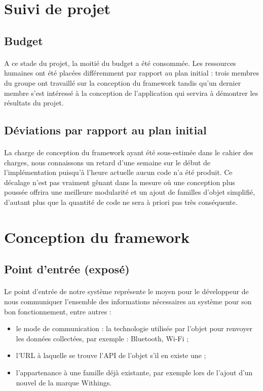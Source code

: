\documentclass[nocopyrightspace]{sigplanconf}
\begin{document}
\section{Suivi de projet}

	\subsection{Budget}
		\paragraph{}
		A ce stade du projet, la moitié du budget a été consommée. Les ressources humaines ont été placées différemment par rapport au plan initial : trois membres du groupe ont travaillé sur la conception du framework tandis qu'un dernier membre s'est intéressé à la conception de l'application qui servira à démontrer les résultats du projet.

	\subsection{Déviations par rapport au plan initial}
		\paragraph{}
		La charge de conception du framework ayant été sous-estimée dans le cahier des charges, nous connaissons un retard d'une semaine sur le début de l'implémentation puisqu'à l'heure actuelle aucun code n'a été produit. Ce décalage n'est pas vraiment gênant dans la mesure où une conception plus poussée offrira une meilleure modularité et un ajout de familles d'objet simplifié, d'autant plus que la quantité de code ne sera à priori pas très conséquente.


\section{Conception du framework}

	\subsection{Point d’entrée (exposé)}
		\paragraph{}
		Le point d’entrée de notre système représente le moyen pour le développeur de nous communiquer l’ensemble des informations nécessaires au système pour son bon fonctionnement, entre autres :
			\begin{itemize}
				\item le mode de communication : la technologie utilisée par l’objet pour renvoyer les données collectées, par exemple : Bluetooth, Wi-Fi ;
				\item l’URL à laquelle se trouve l’API de l’objet s’il en existe une ;
				\item l’appartenance à une famille déjà existante, par exemple lors de l’ajout d’un nouvel de la marque Withings.
			\end{itemize}
\end{document}
